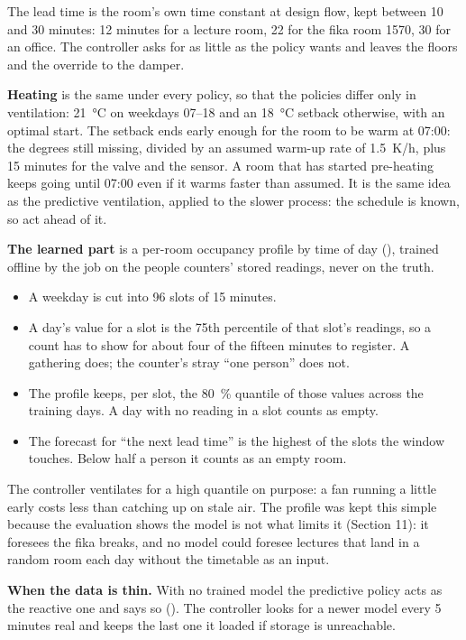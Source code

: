 The lead time is the room's own \COtwo{} time constant at design flow, kept
between 10 and 30 minutes: 12 minutes for a lecture room, 22 for the fika room
1570, 30 for an office. The controller asks for as little as the policy wants
and leaves the floors and the override to the damper.

\textbf{Heating} is the same under every policy, so that the policies differ
only in ventilation: 21~°C on weekdays 07--18 and an 18~°C setback otherwise,
with an optimal start. The setback ends early enough for the room to be warm at
07:00: the degrees still missing, divided by an assumed warm-up rate of
1.5~K/h, plus 15 minutes for the valve and the sensor. A room that has started
pre-heating keeps going until 07:00 even if it warms faster than assumed. It is
the same idea as the predictive ventilation, applied to the slower process: the
schedule is known, so act ahead of it.

\textbf{The learned part} is a per-room occupancy profile by time of day
(), trained offline by the  job on the
people counters' stored readings, never on the truth.
\begin{itemize}
\tightlist
\item A weekday is cut into 96 slots of 15 minutes.
\item A day's value for a slot is the 75th percentile of that slot's readings,
  so a count has to show for about four of the fifteen minutes to register.
  A gathering does; the counter's stray ``one person'' does not.
\item The profile keeps, per slot, the 80~\% quantile of those values across
  the training days. A day with no reading in a slot counts as empty.
\item The forecast for ``the next lead time'' is the highest of the slots the
  window touches. Below half a person it counts as an empty room.
\end{itemize}
The controller ventilates for a high quantile on purpose: a fan running a
little early costs less than catching up on stale air. The profile was kept
this simple because the evaluation shows the model is not what limits it
(Section 11): it foresees the fika breaks, and no model could foresee lectures
that land in a random room each day without the timetable as an input.

\textbf{When the data is thin.} With no trained model the predictive policy
acts as the reactive one and says so (). The controller
looks for a newer model every 5 minutes real and keeps the last one it loaded
if storage is unreachable.

